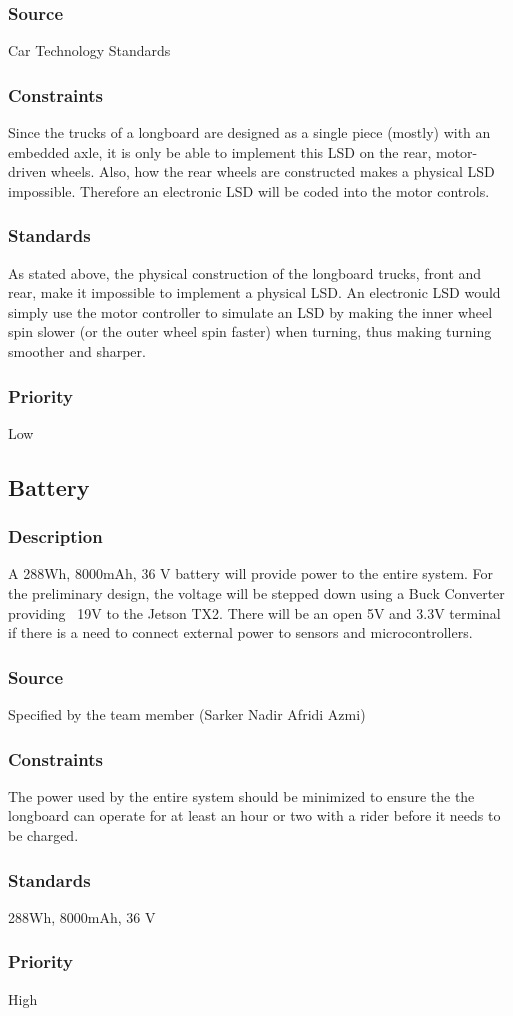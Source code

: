 \subsubsection{Source}
Car Technology Standards
\subsubsection{Constraints}
Since the trucks of a longboard are designed as a single piece (mostly) with an embedded axle, it is only be able to implement this LSD on the rear, motor-driven wheels. Also, how the rear wheels are constructed makes a physical LSD impossible. Therefore an electronic LSD will be coded into the motor controls.
\subsubsection{Standards}
As stated above, the physical construction of the longboard trucks, front and rear, make it impossible to implement a physical LSD. An electronic LSD would simply use the motor controller to simulate an LSD by making the inner wheel spin slower (or the outer wheel spin faster) when turning, thus making turning smoother and sharper.
\subsubsection{Priority}
Low

\subsection{Battery}
\subsubsection{Description}
A 288Wh, 8000mAh, 36 V battery will provide power to the entire system. For the preliminary design, the voltage will be stepped down using a Buck Converter providing ~19V to the Jetson TX2. There will be an open 5V and 3.3V terminal if there is a need to connect external power to sensors and microcontrollers.
\subsubsection{Source}
Specified by the team member (Sarker Nadir Afridi Azmi)
\subsubsection{Constraints}
The power used by the entire system should be minimized to ensure the the longboard can operate for at least an hour or two with a rider before it needs to be charged.
\subsubsection{Standards}
288Wh, 8000mAh, 36 V
\subsubsection{Priority}
High
